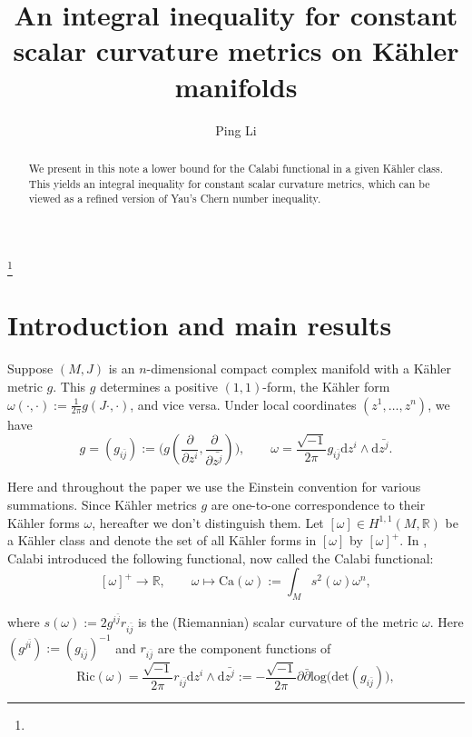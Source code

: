 \documentclass[11pt]{amsart}
\theoremstyle{definition}
\theoremstyle{remark}
\numberwithin{equation}{section}
\begin{document}
\title[An integral inequality on K\"{a}hler manifolds]
{An integral inequality for constant scalar curvature metrics on
K\"{a}hler manifolds}

\author{Ping Li}
\address{Department of Mathematics, Tongji University, Shanghai 200092, China}
\thanks{}



\begin{abstract}
We present in this note a lower bound for the Calabi functional in a
given K\"{a}hler class. This yields an integral inequality for
constant scalar curvature metrics, which can be viewed as a refined
version of Yau's Chern number inequality.
\end{abstract}

\maketitle
\section{Introduction and main results}
Suppose $(M,J)$ is an $n$-dimensional compact complex manifold with
a K\"{a}hler metric $g$. This $g$ determines a positive
$(1,1)$-form, the K\"{a}hler form
$\omega(\cdot,\cdot):=\frac{1}{2\pi}g(J\cdot,\cdot)$, and vice
versa. Under local coordinates $(z^1,\ldots,z^n)$, we have
$$g=(g_{i\bar{j}}):=
\big(g(\frac{\partial}{\partial z^i},\frac{\partial}{\partial
\bar{z^j}})\big),\qquad
\omega=\frac{\sqrt{-1}}{2\pi}g_{i\bar{j}}\text{d}z^i\wedge\text{d}\bar{z^j}.$$

Here and throughout the paper we use the Einstein convention for
various summations. Since K\"{a}hler metrics $g$ are one-to-one
correspondence to their K\"{a}hler forms $\omega$, hereafter we
don't distinguish them. Let $[\omega]\in H^{1,1}(M,\mathbb{R})$ be a
K\"{a}hler class and denote the set of all K\"{a}hler forms in
$[\omega]$ by $[\omega]^{+}$. In \cite{Ca}, Calabi introduced the
following functional, now called the Calabi functional:
$$[\omega]^{+}\rightarrow\mathbb{R},\qquad \omega\mapsto
\text{Ca}(\omega):=\int_Ms^2(\omega)\omega^n,$$

where $s(\omega):=2g^{i\bar{j}}r_{i\bar{j}}$ is the (Riemannian)
scalar curvature of the metric $\omega$. Here
$(g^{j\bar{i}}):=(g_{i\bar{j}})^{-1}$ and $r_{i\bar{j}}$ are the
component functions of
 $$\text{Ric}(\omega)=\frac{\sqrt{-1}}{2\pi}
r_{i\bar{j}}\text{d}z^i\wedge\text{d}\bar{z^j}:=
-\frac{\sqrt{-1}}{2\pi}\partial\bar{\partial}\text{log}\big(
\text{det}(g_{i\bar{j}})\big),$$
\end{document}
